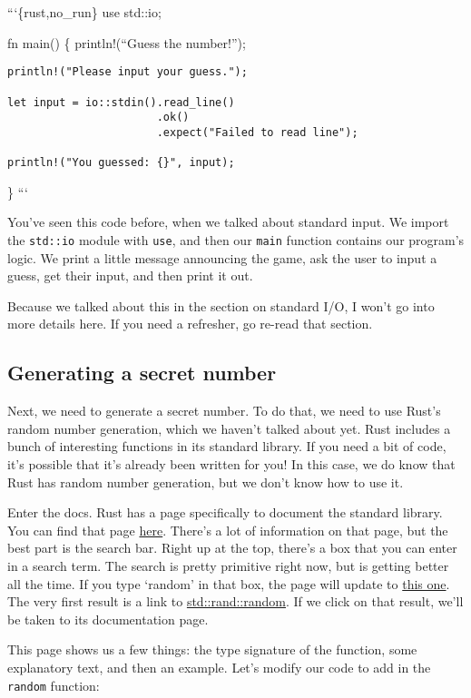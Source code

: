 \documentclass[]{article}
\begin{document}
```\{rust,no\_run\} use std::io;

fn main() \{ println!(``Guess the number!'');

\begin{verbatim}
println!("Please input your guess.");

let input = io::stdin().read_line()
                       .ok()
                       .expect("Failed to read line");

println!("You guessed: {}", input);
\end{verbatim}

\} ```

You've seen this code before, when we talked about standard input. We
import the \texttt{std::io} module with \texttt{use}, and then our
\texttt{main} function contains our program's logic. We print a little
message announcing the game, ask the user to input a guess, get their
input, and then print it out.

Because we talked about this in the section on standard I/O, I won't go
into more details here. If you need a refresher, go re-read that
section.

\subsection{Generating a secret
number}\label{generating-a-secret-number}

Next, we need to generate a secret number. To do that, we need to use
Rust's random number generation, which we haven't talked about yet. Rust
includes a bunch of interesting functions in its standard library. If
you need a bit of code, it's possible that it's already been written for
you! In this case, we do know that Rust has random number generation,
but we don't know how to use it.

Enter the docs. Rust has a page specifically to document the standard
library. You can find that page \href{std/index.html}{here}. There's a
lot of information on that page, but the best part is the search bar.
Right up at the top, there's a box that you can enter in a search term.
The search is pretty primitive right now, but is getting better all the
time. If you type `random' in that box, the page will update to
\href{http://doc.rust-lang.org/std/index.html?search=random}{this one}.
The very first result is a link to
\href{http://doc.rust-lang.org/std/rand/fn.random.html}{std::rand::random}.
If we click on that result, we'll be taken to its documentation page.

This page shows us a few things: the type signature of the function,
some explanatory text, and then an example. Let's modify our code to add
in the \texttt{random} function:
\end{document}
